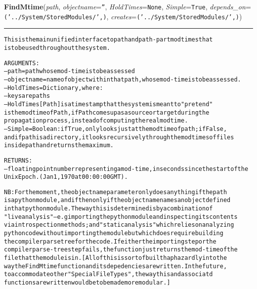 \hspace{.8\funcindent}\begin{boxedminipage}{\funcwidth}

    \raggedright \textbf{FindMtime}(\textit{path}, \textit{objectname}={\tt ''}, \textit{HoldTimes}={\tt None}, \textit{Simple}={\tt True}, \textit{depends\_on}={\tt ('../System/StoredModules/',)}, \textit{creates}={\tt ('../System/StoredModules/',)})

    \vspace{-1.5ex}

    \rule{\textwidth}{0.5\fboxrule}
\setlength{\parskip}{2ex}
\begin{alltt}

This is the main unified interface to path and path-part mod times that 
is to be used throughout the system.  

ARGUMENTS:
--path = path whose mod-time is to be assessed  
--objectname = name of object within that path, whose mod-time is to be assessed. 
--HoldTimes = Dictionary, where:
        --keys are paths
        --HoldTimes[Path] is a timestamp that the system is meant to "pretend" 
        is the mod time of Path, if Path comes up as a source or target during the 
        propagation process, instead of computing the real mod time. 
-- Simple = Boolean : if True, only looks just at the modtime of path; if False, 
and if path is a directory, it looks recursively through the mod times of files
inside path and returns the maximum.  

RETURNS:
-- floating point number representing a mod-time, in seconds since the start of the  
Unix Epoch.  (Jan 1, 1970 at 00:00:00 GMT). 
        
NB: For the moment, the object name parameter only does anything if the path
is a python module, and if then only if the objectname names an object defined 
in that python module.   The way this is determined is by a combination of
"live analysis" -- e.g importing the python module and inspecting its contents 
via introspection methods;  and "static analysis" which relies on analyzing 
python code without importing the module but which does require building 
the compiler parse tree for the code.  If either the importing step or the 
compiler parse-tree step fails, the function just returns the mod-time of the 
file that the module is in.  [All of this is sort of built haphazardly in to the 
way the FindMtime function and its depedencies are written.  In the future, 
to accommodate other "Special File Types", the way this and associatd 
functions are written would be to be made more modular.] 
\end{alltt}

\setlength{\parskip}{1ex}
    \end{boxedminipage}

